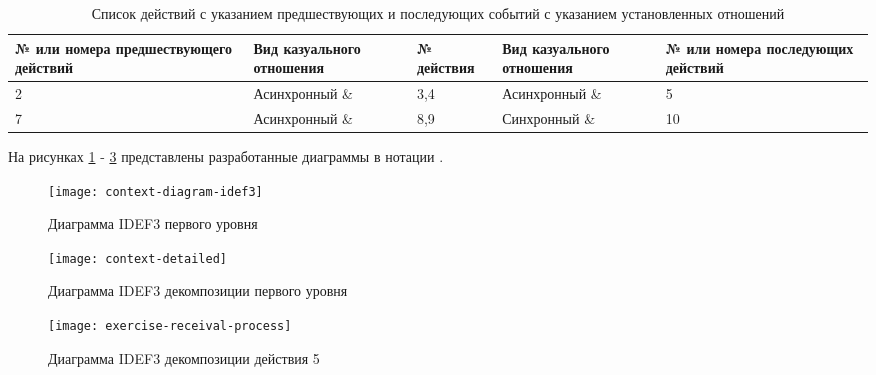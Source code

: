 \documentclass[a4paper,14pt]{extarticle}
\begin{document}
\begin{table}[H]
    \caption{Список действий с указанием предшествующих и последующих событий с указанием установленных отношений}
    \begin{tabular}{| p{3cm} | p{3cm} | p{3cm} | p{3cm} | p{3cm} |}
        \hline
        № или номера предшествующего действий & Вид казуального отношения & № действия & Вид казуального отношения & № или номера последующих действий \\ \hline
        2 & Асинхронный \& & 3,4 & Асинхронный \& & 5 \\ \hline
        7 & Асинхронный \& & 8,9 & Синхронный \& & 10 \\ \hline
    \end{tabular}
\end{table}

На рисунках \ref{fig:context-diagram} - \ref{fig:exercise-receival-process}
представлены разработанные диаграммы в нотации .

\begin{figure}[H]
    \centering
    \texttt{[image: context-diagram-idef3]}
    \caption{Диаграмма IDEF3 первого уровня}
    \label{fig:context-diagram}
\end{figure}

\begin{figure}[H]
    \centering
    \texttt{[image: context-detailed]}
    \caption{Диаграмма IDEF3 декомпозиции первого уровня}
    \label{fig:context-detailed}
\end{figure}

\begin{figure}[H]
    \centering
    \texttt{[image: exercise-receival-process]}
    \caption{Диаграмма IDEF3 декомпозиции действия 5}
    \label{fig:exercise-receival-process}
\end{figure}
\end{document}
